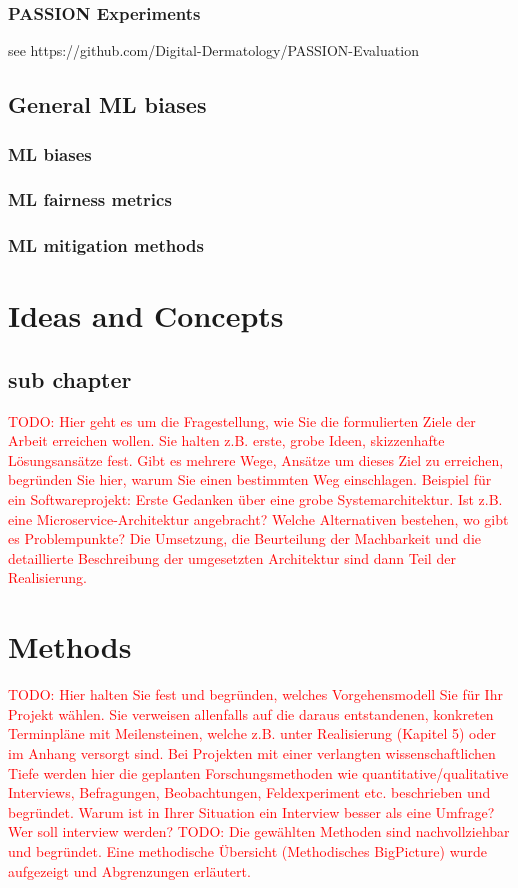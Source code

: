 \documentclass[a4paper,10.5pt,
			   bindingoffset=0.2in,left=3.35cm,right=2.12cm,top=3.75cm,bottom=2.88cm,%
				footskip=.25in
				listof=numbered,toc=chapterentrywithdots]{scrreport}
\renewcommand{\todo}[1]{\textcolor{red}{TODO: #1}}
\begin{document}
			\subsection{PASSION Experiments}
			see https://github.com/Digital-Dermatology/PASSION-Evaluation
			
			
		\section{General ML biases}
			\subsection{ML biases}
			
			\subsection{ML fairness metrics}
			
			\subsection{ML mitigation methods}
			
	
	\chapter{Ideas and Concepts}
	\section{sub chapter}
		\todo{Hier geht es um die Fragestellung, wie Sie die formulierten Ziele der Arbeit erreichen wollen. Sie halten z.B. erste, grobe Ideen, skizzenhafte Lösungsansätze fest. Gibt es mehrere Wege, Ansätze um dieses Ziel zu erreichen, begründen Sie hier, warum Sie einen bestimmten Weg einschlagen. Beispiel für ein Softwareprojekt: Erste Gedanken über eine grobe Systemarchitektur. Ist z.B. eine Microservice-Architektur angebracht? Welche Alternativen bestehen, wo gibt es Problempunkte? Die Umsetzung, die Beurteilung der Machbarkeit und die detaillierte Beschreibung der umgesetzten Architektur sind dann Teil der Realisierung.}
	
	\chapter{Methods}
		\todo{Hier halten Sie fest und begründen, welches Vorgehensmodell Sie für Ihr Projekt wählen. Sie verweisen allenfalls auf die daraus entstandenen, konkreten Terminpläne mit Meilensteinen, welche z.B. unter Realisierung (Kapitel 5) oder im Anhang versorgt sind. Bei Projekten mit einer verlangten wissenschaftlichen Tiefe werden hier die geplanten Forschungsmethoden wie quantitative/qualitative Interviews, Befragungen, Beobachtungen, Feldexperiment etc. beschrieben und begründet. Warum ist in Ihrer Situation ein Interview besser als eine Umfrage? Wer soll interview werden?}
		\todo{Die gewählten Methoden sind nachvollziehbar und begründet. Eine methodische Übersicht (Methodisches BigPicture) wurde aufgezeigt und Abgrenzungen erläutert.}
	
\end{document}
